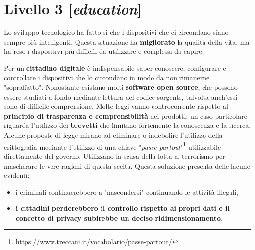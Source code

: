 \chapter{Livello 3 [\emph{education}]}
 Lo sviluppo tecnologico ha fatto si che i dispositivi che ci circondano siano sempre più intelligenti. Questa situazione ha \textbf{migliorato} la qualità della vita, ma ha reso i dispositivi più difficili da utilizzare e complessi da capire. 

Per un \textbf{cittadino digitale} è indispensabile saper conoscere, configurare e controllare i dispositivi che lo circondano in modo da non rimanerne "sopraffatto".
Nonostante esistano molti \textbf{software open source}, che possono essere studiati a fondo mediante lettura del codice sorgente, talvolta anch'essi sono di difficile comprensione.
\bigbreak
Molte leggi vanno controcorrente rispetto al \textbf{principio di trasparenza e comprensibilità} dei prodotti; un caso particolare riguarda l'utilizzo dei \textbf{brevetti} che limitano fortemente la conoscenza e la ricerca.
Alcune proposte di legge mirano ad eliminare o indebolire l'utilizzo della crittografia mediante l'utilizzo di una chiave "\emph{passe-partout}"\footnote{\url{https://www.treccani.it/vocabolario/passe-partout/}} utilizzabile direttamente dal governo. Utilizzano la scusa della lotta al terrorismo per mascherare le vere ragioni di questa scelta. Questa soluzione presenta delle lacune evidenti:
\begin{itemize}
    \item i criminali continuerebbero a "nascondersi" continuando le attività illegali,
    \item \textbf{i cittadini perderebbero il controllo rispetto ai propri dati e il concetto di privacy subirebbe un deciso ridimensionamento}.
\end{itemize}

